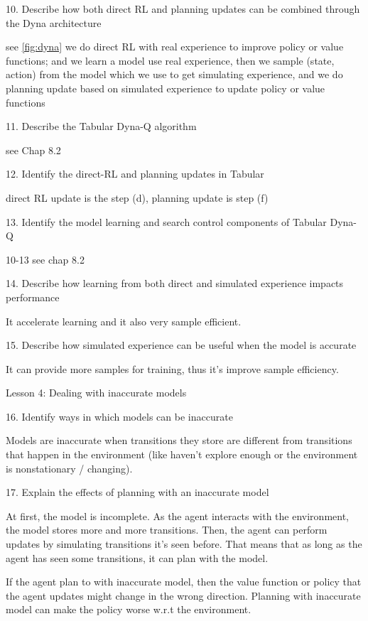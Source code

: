 \documentclass[sutton_barto_notes.tex]{subfiles}
\begin{document}
10. Describe how both direct RL and planning updates can be combined through the Dyna architecture

see \ref{fig:dyna} we do direct RL with real experience to improve policy or value functions; and we learn a model use real experience, then we sample (state, action) from the model which we use to get simulating experience, and we do planning update based on simulated experience to update policy or value functions

11. Describe the Tabular Dyna-Q algorithm 

see Chap 8.2

12. Identify the direct-RL and planning updates in Tabular 

direct RL update is the step (d), planning update is step (f)

13. Identify the model learning and search control components of Tabular Dyna-Q 

10-13 see chap 8.2

14. Describe how learning from both direct and simulated experience impacts performance 

It accelerate learning and it also very sample efficient.

15. Describe how simulated experience can be useful when the model is accurate 

It can provide more samples for training, thus it's improve sample efficiency.

Lesson 4: Dealing with inaccurate models 

16. Identify ways in which models can be inaccurate 

Models are inaccurate when transitions they store are different from transitions that happen in the environment (like haven't explore enough or the environment is nonstationary / changing).


17. Explain the effects of planning with an inaccurate model 

At first, the model is incomplete. As the agent interacts with the environment, the model stores more and more transitions. Then, the agent can perform updates by simulating transitions it's seen before. That means that as long as the agent has seen some transitions, it can plan with the model.

If the agent plan to with inaccurate model, then the value function or policy that the agent updates might change in the wrong direction. Planning with inaccurate model can make the policy worse w.r.t the environment.
\end{document}
